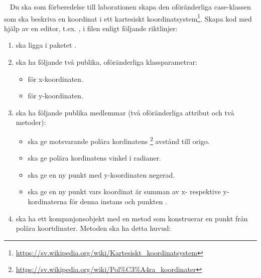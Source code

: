 \Task \what~
Du ska som förberedelse till laborationen skapa den oföränderliga case-klassen  som ska beskriva en koordinat i ett kartesiskt koordinatsystem\footnote{\url{https://sv.wikipedia.org/wiki/Kartesiskt_koordinatsystem}}. Skapa kod med hjälp av en editor, t.ex. , i filen   enligt följande riktlinjer:
\begin{enumerate}[noitemsep]
\item {} ska ligga i paketet .

\item {} ska ha följande två publika, oföränderliga klassparametrar:
\begin{itemize}[nolistsep, noitemsep]
\item {} för x-koordinaten.
\item {} för y-koordinaten.
\end{itemize}

\item {} ska ha följande publika medlemmar (två oföränderliga attribut och två metoder):
\begin{itemize}[nolistsep, noitemsep]
\item {} ska ge motsvarande polära kordinatens%
\footnote{\url{https://sv.wikipedia.org/wiki/Pol\%C3\%A4ra\_koordinater}}
 avstånd till origo.
\item {} ska ge polära kordinatens vinkel i radianer.
\item {} ska ge en ny punkt med y-koordinaten negerad.
\item {} ska ge en ny punkt vars koordinat är summan av x- respektive y-kordinaterna för denna instans och punkten .
\end{itemize}

\item {} ska ha ett kompanjonsobjekt med en metod som konstruerar en punkt från polära koortdinater. Metoden ska ha detta huvud: \\

\end{enumerate}

